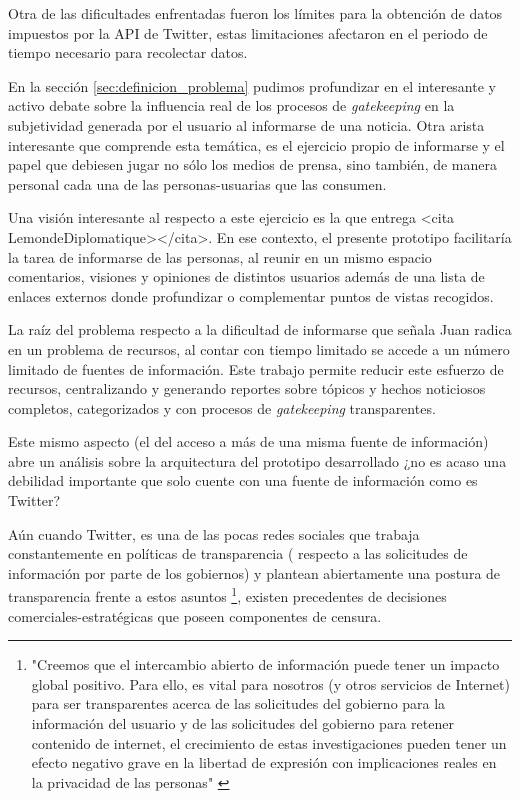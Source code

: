 Otra de las dificultades enfrentadas fueron los límites para la obtención de datos impuestos por la API de Twitter, estas limitaciones afectaron en el periodo de tiempo necesario para recolectar datos. 


En la sección \ref{sec:definicion_problema} pudimos profundizar en el interesante y activo debate sobre la influencia real de los procesos de \emph{gatekeeping} en la subjetividad generada por el usuario al informarse de una noticia. Otra arista interesante que comprende esta temática, es el ejercicio propio de informarse y el papel que debiesen jugar no sólo los medios de prensa, sino también, de manera personal cada una de las personas-usuarias que las consumen.

Una visión interesante al respecto a este ejercicio es la que entrega <cita LemondeDiplomatique></cita>.
En ese contexto, el presente prototipo facilitaría la tarea de informarse de las personas, al reunir en un mismo espacio comentarios, visiones y opiniones de distintos usuarios además de una lista de enlaces externos donde profundizar o complementar puntos de vistas recogidos.

La raíz del problema respecto a la dificultad de informarse que señala Juan 
radica en un problema de recursos, al contar con tiempo limitado se accede a un número limitado de fuentes de información. Este trabajo permite reducir este esfuerzo de recursos, centralizando y generando reportes sobre tópicos y hechos noticiosos completos, categorizados y con procesos de \emph{gatekeeping} transparentes.

Este mismo aspecto (el del acceso a más de una misma fuente de información) abre un análisis sobre la arquitectura del prototipo desarrollado ¿no es acaso una debilidad importante que solo cuente con una fuente de información como es Twitter?

Aún cuando Twitter, es una de las pocas redes sociales que trabaja constantemente en políticas de transparencia ( respecto a las solicitudes de información por parte de los gobiernos)  y plantean abiertamente una postura de transparencia frente a estos asuntos \footnote{"Creemos que el intercambio abierto de información puede tener un impacto global positivo. Para ello, es vital para nosotros (y otros servicios de Internet) para ser transparentes acerca de las solicitudes del gobierno para la información del usuario y de las solicitudes del gobierno para retener contenido de internet, el crecimiento de estas investigaciones pueden tener un efecto negativo grave en la libertad de expresión con implicaciones reales en la privacidad de las personas" \cite{tweetsStillMustFlow} }, existen precedentes de decisiones comerciales-estratégicas que poseen componentes de censura.

